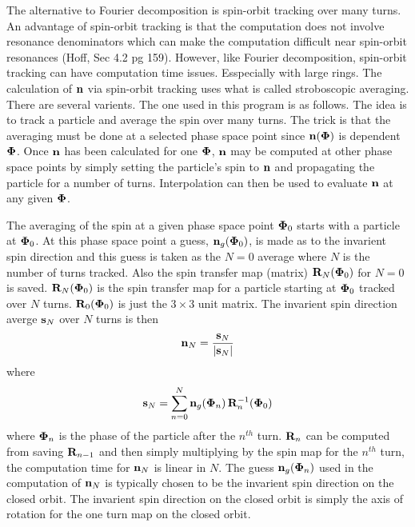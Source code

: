 \documentclass[11pt,openany]{report}
\newcommand{\Bf}[1]{{\bf #1}}
\newcommand{\bfn}{{\Bf n}}
\newcommand{\bfs}{{\Bf s}}
\newcommand{\bfR}{{\Bf R}}
\newcommand{\bfPhi}{{\Bf \Phi}}
\newcommand{\Begineq}{\begin{equation}}
\newcommand{\Endeq}{\end{equation}}
\newcommand{\Th}{$^{th}$\xspace}
\begin{document}
The alternative to Fourier decomposition is spin-orbit tracking over many turns. An advantage of
spin-orbit tracking is that the computation does not involve resonance denominators which can make
the computation difficult near spin-orbit resonances (Hoff, Sec 4.2 pg 159). However, like Fourier
decomposition, spin-orbit tracking can have computation time issues. Esspecially with large
rings. The calculation of $\bfn$ via spin-orbit tracking uses what is called stroboscopic averaging.
There are several varients. The one used in this program is as follows. The idea is to track a
particle and average the spin over many turns. The trick is that the averaging must be done at a
selected phase space point since $\bfn(\bfPhi)$ is dependent $\bfPhi$. Once $\bfn$ has been
calculated for one $\bfPhi$, $\bfn$ may be computed at other phase space points by simply setting
the particle's spin to $\bfn$ and propagating the particle for a number of turns. Interpolation can
then be used to evaluate $\bfn$ at any given $\bfPhi$.

The averaging of the spin at a given phase space point $\bfPhi_0$ starts with a particle at
$\bfPhi_0$. At this phase space point a guess, $\bfn_g(\bfPhi_0)$, is made as to the invarient spin
direction and this guess is taken as the $N = 0$ average where $N$ is the number of turns
tracked. Also the spin transfer map (matrix) $\bfR_N(\bfPhi_0)$ for $N = 0$ is
saved. $\bfR_N(\bfPhi_0)$ is the spin transfer map for a particle starting at $\bfPhi_0$ tracked
over $N$ turns. $\bfR_0(\bfPhi_0)$ is just the $3 \times 3$ unit matrix. The invarient spin
direction averge $\bfs_N$ over $N$ turns is then
\Begineq
  \bfn_N = \frac{ \bfs_N }{ | \bfs_N | }
\Endeq
where
\Begineq
  \bfs_N = \sum_{n = 0}^N \bfn_g(\bfPhi_n) \, \bfR_n^{-1}(\bfPhi_0)
  \label{snng}
\Endeq
where $\bfPhi_n$ is the phase of the particle after the $n$\Th turn. $\bfR_n$ can be computed
from saving $\bfR_{n-1}$ and then simply multiplying by the spin map for the $n$\Th turn, the
computation time for $\bfn_N$ is linear in $N$. The guess $\bfn_g(\bfPhi_n)$ used in the computation
of $\bfn_N$ is typically chosen to be the invarient spin direction on the closed orbit. The
invarient spin direction on the closed orbit is simply the axis of rotation for the one turn map
on the closed orbit. 
\end{document}
